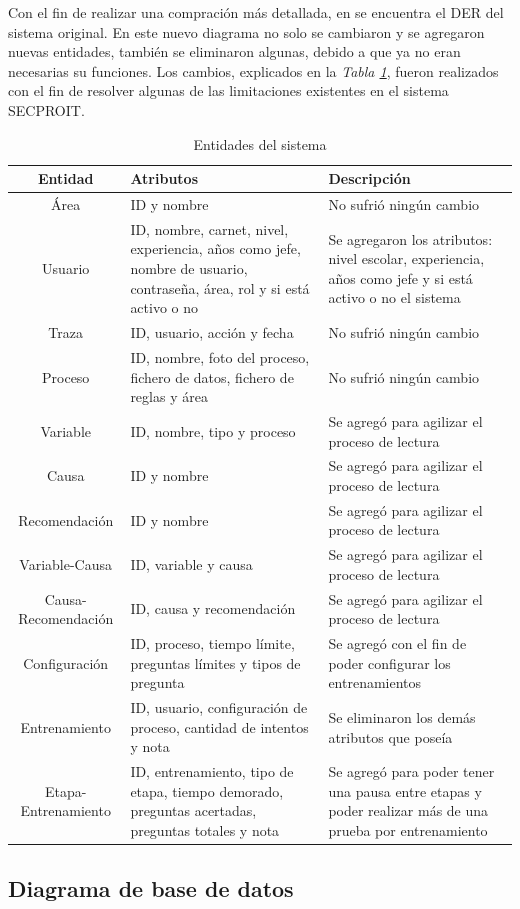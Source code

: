 Con el fin de realizar una compración más detallada, en \cite{ElenaAcostaGil2018} se encuentra el DER del sistema original. En este nuevo diagrama no solo se cambiaron y se agregaron nuevas entidades, también se eliminaron algunas, debido a que ya no eran necesarias su funciones. Los cambios, explicados en la \textsl{Tabla \ref{tab:entidades}}, fueron realizados con el fin de resolver algunas de las limitaciones existentes en el sistema SECPROIT.

\begin{table}[H]
\begin{center}
\begin{tabular}{ | c | p{5cm} |  p{5cm} | }
\hline
\textbf{Entidad} & \textbf{Atributos}  & \textbf{Descripción}\\
\hline
Área & ID y nombre & No sufrió ningún cambio \\
\hline
Usuario & ID, nombre, carnet, nivel, experiencia, años como jefe, nombre de usuario, contraseña, área, rol y si está activo o no & Se agregaron los atributos: nivel escolar, experiencia, años como jefe y si está activo o no el sistema\\
\hline
Traza & ID, usuario, acción y fecha & No sufrió ningún cambio \\
\hline
Proceso & ID, nombre, foto del proceso, fichero de datos, fichero de reglas y área & No sufrió ningún cambio \\
\hline
Variable & ID, nombre, tipo y proceso & Se agregó para agilizar el proceso de lectura \\
\hline
Causa & ID y nombre & Se agregó para agilizar el proceso de lectura \\
\hline
Recomendación & ID y nombre & Se agregó para agilizar el proceso de lectura \\
\hline
Variable-Causa & ID, variable y causa & Se agregó para agilizar el proceso de lectura \\
\hline
Causa-Recomendación & ID, causa y recomendación & Se agregó para agilizar el proceso de lectura \\
\hline
Configuración & ID, proceso, tiempo límite, preguntas límites y tipos de pregunta & Se agregó con el fin de poder configurar los entrenamientos \\
\hline
Entrenamiento & ID, usuario, configuración de proceso, cantidad de intentos y nota & Se eliminaron los demás atributos que poseía \\
\hline
Etapa-Entrenamiento & ID, entrenamiento, tipo de etapa, tiempo demorado, preguntas acertadas, preguntas totales y nota & Se agregó para poder tener una pausa entre etapas y poder realizar más de una prueba por entrenamiento \\
\hline
\end{tabular}
\caption{Entidades del sistema}
\label{tab:entidades}
\end{center}
\end{table}

\subsection{Diagrama de base de datos}